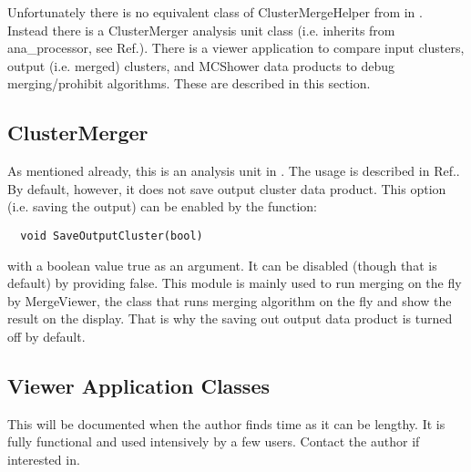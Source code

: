 Unfortunately there is no equivalent class of {\ttfamily ClusterMergeHelper} from {\larsoft} in {\larlight}. 
Instead there is a {\ttfamily ClusterMerger} analysis unit class (i.e. inherits from {\ttfamily ana\_processor}, see Ref.\cite{LArLight}). There is a viewer application to compare input clusters, output (i.e. merged) clusters, and {\ttfamily MCShower} data products to debug merging/prohibit algorithms. These are described in this section.

\subsection{{\ttfamily ClusterMerger}}
As mentioned already, this is an analysis unit in {\larlight}. The usage is described in Ref.\cite{LArLight}. 
By default, however, it does not save output cluster data product. 
This option (i.e. saving the output) can be enabled by the function:
\begin{lstlisting}
  void SaveOutputCluster(bool)
\end{lstlisting}
with a boolean value {\ttfamily true} as an argument. 
It can be disabled (though that is default) by providing {\ttfamily false}.
This module is mainly used to run merging on the fly by {\ttfamily MergeViewer}, the class that runs merging algorithm on the fly and show the result on the display.
That is why the saving out output data product is turned off by default.

\subsection{Viewer Application Classes}
This will be documented when the author finds time as it can be lengthy. 
It is fully functional and used intensively by a few users. 
Contact the author if interested in.

